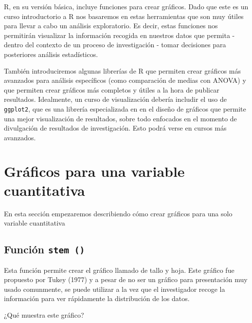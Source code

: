 \documentclass[
]{book}
\begin{document}
R, en su versión básica, incluye funciones para crear gráficos. Dado que este es un curso introductorio a R nos basaremos en estas herramientas que son muy útiles para llevar a cabo un análisis exploratorio. Es decir, estas funciones nos permitirán visualizar la información recogida en nuestros datos que permita - dentro del contexto de un proceso de investigación - tomar decisiones para posteriores análisis estadísticos.

También introduciremos algunas librerías de R que permiten crear gráficos más avanzados para análisis específicos (como comparación de medias con ANOVA) y que permiten crear gráficos más completos y útiles a la hora de publicar resultados. Idealmente, un curso de visualización debería includir el uso de \texttt{ggplot2}, que es una librería especializada en en el diseño de gráficos que permite una mejor visualización de resultados, sobre todo enfocados en el momento de divulgación de resultados de investigación. Esto podrá verse en cursos más avanzados.

\hypertarget{gruxe1ficos-para-una-variable-cuantitativa}{%
\section{Gráficos para una variable cuantitativa}\label{gruxe1ficos-para-una-variable-cuantitativa}}

En esta sección empezaremos describiendo cómo crear gráficos para una solo variable cuantitativa

\hypertarget{funciuxf3n-stem}{%
\subsection{\texorpdfstring{Función \texttt{stem\ ()}}{Función stem ()}}\label{funciuxf3n-stem}}

Esta función permite crear el gráfico llamado de tallo y hoja. Este gráfico fue propuesto por Tukey (1977) y a pesar de no ser un gráfico para presentación muy usado comunmente, se puede utilizar a la vez que el investigador recoge la información para ver rápidamente la distribución de los datos.

¿Qué muestra este gráfico?
\end{document}
